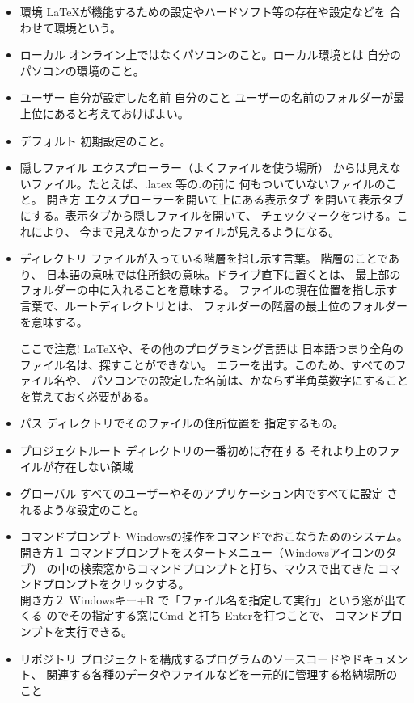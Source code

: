 \documentclass{ltjsarticle}
\begin{document}
\begin{itemize}
  \item 環境 \LaTeX が機能するための設定やハードソフト等の存在や設定などを
        合わせて環境という。
  \item ローカル  オンライン上ではなくパソコンのこと。ローカル環境とは
        自分のパソコンの環境のこと。
  \item ユーザー 自分が設定した名前 自分のこと
        ユーザーの名前のフォルダーが最上位にあると考えておけばよい。
  \item デフォルト 初期設定のこと。
  \item 隠しファイル エクスプローラー（よくファイルを使う場所）
        からは見えないファイル。たとえば、.latex 等の.の前に
        何もついていないファイルのこと。
        開き方 エクスプローラーを開いて上にある表示タブ
        を開いて表示タブにする。表示タブから隠しファイルを開いて、
        チェックマークをつける。これにより、
        今まで見えなかったファイルが見えるようになる。

  \item ディレクトリ ファイルが入っている階層を指し示す言葉。
        階層のことであり、
        日本語の意味では住所録の意味。ドライブ直下に置くとは、
        最上部のフォルダーの中に入れることを意味する。
        ファイルの現在位置を指し示す言葉で、ルートディレクトリとは、
        フォルダーの階層の最上位のフォルダーを意味する。


        ここで注意! LaTeXや、その他のプログラミング言語は
        日本語つまり全角のファイル名は、探すことができない。
        エラーを出す。このため、すべてのファイル名や、
        パソコンでの設定した名前は、かならず半角英数字にすること
        を覚えておく必要がある。
  \item パス ディレクトリでそのファイルの住所位置を
        指定するもの。
  \item プロジェクトルート ディレクトリの一番初めに存在する
        それより上のファイルが存在しない領域
  \item グローバル すべてのユーザーやそのアプリケーション内ですべてに設定
        されるような設定のこと。
  \item コマンドプロンプト Windowsの操作をコマンドでおこなうためのシステム。\\
        開き方１ コマンドプロンプトをスタートメニュー（Windowsアイコンのタブ）
        の中の検索窓からコマンドプロンプトと打ち、マウスで出てきた
        コマンドプロンプトをクリックする。\\
        開き方２ Windowsキー+R で「ファイル名を指定して実行」という窓が出てくる
        のでその指定する窓にCmd と打ち Enterを打つことで、
        コマンドプロンプトを実行できる。
  \item リポジトリ
        プロジェクトを構成するプログラムのソースコードやドキュメント、
         関連する各種のデータやファイルなどを一元的に管理する格納場所のこと

\end{itemize}
\end{document}
